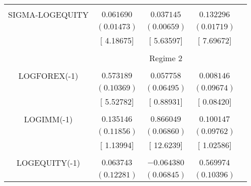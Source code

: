 \begin{tabular}{lrrrr}
\multicolumn{1}{c}{}&\multicolumn{1}{c}{}&\multicolumn{1}{c}{}&\multicolumn{1}{c}{}&\multicolumn{1}{c}{}\\
\multicolumn{1}{c}{SIGMA-LOGEQUITY}&\multicolumn{1}{c}{$0.061690$}&\multicolumn{1}{c}{$0.037145$}&\multicolumn{1}{c}{$0.132296$}&\multicolumn{1}{c}{}\\
\multicolumn{1}{c}{}&\multicolumn{1}{c}{$(0.01473)$}&\multicolumn{1}{c}{$(0.00659)$}&\multicolumn{1}{c}{$(0.01719)$}&\multicolumn{1}{c}{}\\
\multicolumn{1}{c}{}&\multicolumn{1}{c}{[ 4.18675]}&\multicolumn{1}{c}{[ 5.63597]}&\multicolumn{1}{c}{[ 7.69672]}&\multicolumn{1}{c}{}\\
[4.5pt] \hline \\ [-4.5pt]
\multicolumn{1}{c}{}&\multicolumn{3}{c}{Regime 2}&\multicolumn{1}{c}{}\\
[4.5pt] \hline \\ [-4.5pt]
\multicolumn{1}{c}{LOGFOREX(-1)}&\multicolumn{1}{c}{$0.573189$}&\multicolumn{1}{c}{$0.057758$}&\multicolumn{1}{c}{$0.008146$}&\multicolumn{1}{c}{}\\
\multicolumn{1}{c}{}&\multicolumn{1}{c}{$(0.10369)$}&\multicolumn{1}{c}{$(0.06495)$}&\multicolumn{1}{c}{$(0.09674)$}&\multicolumn{1}{c}{}\\
\multicolumn{1}{c}{}&\multicolumn{1}{c}{[ 5.52782]}&\multicolumn{1}{c}{[ 0.88931]}&\multicolumn{1}{c}{[ 0.08420]}&\multicolumn{1}{c}{}\\
\multicolumn{1}{c}{}&\multicolumn{1}{c}{}&\multicolumn{1}{c}{}&\multicolumn{1}{c}{}&\multicolumn{1}{c}{}\\
\multicolumn{1}{c}{LOGIMM(-1)}&\multicolumn{1}{c}{$0.135146$}&\multicolumn{1}{c}{$0.866049$}&\multicolumn{1}{c}{$0.100147$}&\multicolumn{1}{c}{}\\
\multicolumn{1}{c}{}&\multicolumn{1}{c}{$(0.11856)$}&\multicolumn{1}{c}{$(0.06860)$}&\multicolumn{1}{c}{$(0.09762)$}&\multicolumn{1}{c}{}\\
\multicolumn{1}{c}{}&\multicolumn{1}{c}{[ 1.13994]}&\multicolumn{1}{c}{[ 12.6239]}&\multicolumn{1}{c}{[ 1.02586]}&\multicolumn{1}{c}{}\\
\multicolumn{1}{c}{}&\multicolumn{1}{c}{}&\multicolumn{1}{c}{}&\multicolumn{1}{c}{}&\multicolumn{1}{c}{}\\
\multicolumn{1}{c}{LOGEQUITY(-1)}&\multicolumn{1}{c}{$0.063743$}&\multicolumn{1}{c}{$-0.064380$}&\multicolumn{1}{c}{$0.569974$}&\multicolumn{1}{c}{}\\
\multicolumn{1}{c}{}&\multicolumn{1}{c}{$(0.12281)$}&\multicolumn{1}{c}{$(0.06845)$}&\multicolumn{1}{c}{$(0.10396)$}&\multicolumn{1}{c}{}\\

\end{tabular}
